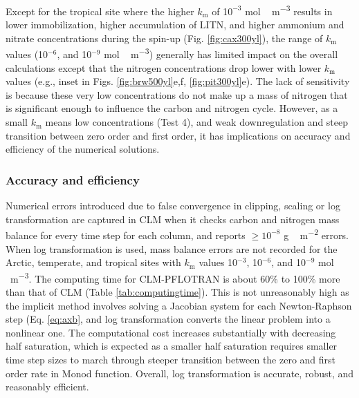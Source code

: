 \documentclass[gmd, manuscript]{copernicus}
\begin{document}
Except for the tropical site where the higher $k_\text{m}$ of 1$0^{-3}$
\unit{mol\,m^{-3}} results in lower immobilization, higher accumulation of
LITN, and higher ammonium and nitrate concentrations during the spin-up (Fig.
\ref{fig:cax300yl}), the range of $k_\text{m}$ values (10$^{-6}$,
and 10$^{-9}$ \unit{mol\,m^{-3}}) generally has limited impact on the overall
calculations except that the nitrogen concentrations drop lower with lower
$k_\text{m}$ values (e.g., inset in Figs. \ref{fig:brw500yl}e,f,
\ref{fig:pit300yl}e). The lack of
sensitivity is because these very low concentrations do not make up a mass of
nitrogen that is significant enough to influence the carbon and nitrogen cycle.
However, as a small $k_\text{m}$ means low concentrations (Test 4), and weak downregulation and steep transition
between zero order and first order, it has implications on accuracy
and efficiency of the numerical solutions.

\subsubsection{Accuracy and efficiency}
Numerical errors introduced due to false convergence in clipping, scaling or
log transformation are captured in CLM when it checks carbon and nitrogen mass
balance for every time step for each column, and reports  $\geq 10^{-8}$
\unit{g\,m^{-2}} errors.  
When log transformation is used, 
mass balance errors are not recorded for the Arctic, temperate, and tropical
sites with $k_\text{m}$ values 
10$^{-3}$, 10$^{-6}$, and 10$^{-9}$ \unit{mol\,m^{-3}}. The computing time for
CLM-PFLOTRAN is about 60\% to 100\% more than that of CLM (Table
\ref{tab:computingtime}). This is not unreasonably high as the implicit
method involves solving a Jacobian system for each Newton-Raphson step (Eq. \ref{eq:axb}, and log transformation converts
the linear
problem into a nonlinear one. 
The computational cost increases substantially with
decreasing half saturation, which is expected as a smaller half saturation
requires smaller time step sizes to march through steeper transition between
the zero and first order rate in Monod function. Overall, log transformation is
accurate, robust, and reasonably efficient.  
\end{document}
